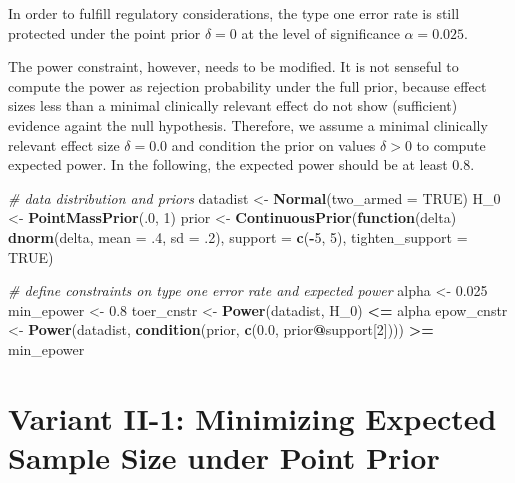 \documentclass[
]{book}
\newenvironment{Shaded}{\begin{snugshade}}{\end{snugshade}}
\newcommand{\CommentTok}[1]{\textcolor[rgb]{0.56,0.35,0.01}{\textit{#1}}}
\newcommand{\ControlFlowTok}[1]{\textcolor[rgb]{0.13,0.29,0.53}{\textbf{#1}}}
\newcommand{\DataTypeTok}[1]{\textcolor[rgb]{0.13,0.29,0.53}{#1}}
\newcommand{\DecValTok}[1]{\textcolor[rgb]{0.00,0.00,0.81}{#1}}
\newcommand{\FloatTok}[1]{\textcolor[rgb]{0.00,0.00,0.81}{#1}}
\newcommand{\KeywordTok}[1]{\textcolor[rgb]{0.13,0.29,0.53}{\textbf{#1}}}
\newcommand{\NormalTok}[1]{#1}
\newcommand{\OperatorTok}[1]{\textcolor[rgb]{0.81,0.36,0.00}{\textbf{#1}}}
\newcommand{\OtherTok}[1]{\textcolor[rgb]{0.56,0.35,0.01}{#1}}
\newcommand{\StringTok}[1]{\textcolor[rgb]{0.31,0.60,0.02}{#1}}
\begin{document}
In order to fulfill regulatory considerations, the type one error rate
is still protected under the point prior \(\delta = 0\) at the level
of significance \(\alpha = 0.025\).

The power constraint, however, needs to be modified.
It is not senseful to compute the power as rejection probability under
the full prior, because effect sizes less than a minimal clinically relevant
effect do not show (sufficient) evidence againt the null hypothesis.
Therefore, we assume a minimal clinically relevant effect size
\(\delta = 0.0\) and condition the prior on values \(\delta > 0\)
to compute expected power.
In the following, the expected power should be at least \(0.8\).

\begin{Shaded}
\begin{Highlighting}[]
\CommentTok{# data distribution and priors}
\NormalTok{datadist   <-}\StringTok{ }\KeywordTok{Normal}\NormalTok{(}\DataTypeTok{two_armed =} \OtherTok{TRUE}\NormalTok{)}
\NormalTok{H_}\DecValTok{0}\NormalTok{        <-}\StringTok{ }\KeywordTok{PointMassPrior}\NormalTok{(.}\DecValTok{0}\NormalTok{, }\DecValTok{1}\NormalTok{)}
\NormalTok{prior      <-}\StringTok{ }\KeywordTok{ContinuousPrior}\NormalTok{(}\ControlFlowTok{function}\NormalTok{(delta) }\KeywordTok{dnorm}\NormalTok{(delta, }\DataTypeTok{mean =} \FloatTok{.4}\NormalTok{, }\DataTypeTok{sd =} \FloatTok{.2}\NormalTok{),}
                              \DataTypeTok{support =} \KeywordTok{c}\NormalTok{(}\OperatorTok{-}\DecValTok{5}\NormalTok{, }\DecValTok{5}\NormalTok{),}
                              \DataTypeTok{tighten_support =} \OtherTok{TRUE}\NormalTok{)}

\CommentTok{# define constraints on type one error rate and expected power}
\NormalTok{alpha      <-}\StringTok{ }\FloatTok{0.025}
\NormalTok{min_epower <-}\StringTok{ }\FloatTok{0.8}
\NormalTok{toer_cnstr <-}\StringTok{ }\KeywordTok{Power}\NormalTok{(datadist, H_}\DecValTok{0}\NormalTok{) }\OperatorTok{<=}\StringTok{ }\NormalTok{alpha}
\NormalTok{epow_cnstr <-}\StringTok{ }\KeywordTok{Power}\NormalTok{(datadist, }\KeywordTok{condition}\NormalTok{(prior, }\KeywordTok{c}\NormalTok{(}\FloatTok{0.0}\NormalTok{, prior}\OperatorTok{@}\NormalTok{support[}\DecValTok{2}\NormalTok{]))) }\OperatorTok{>=}\StringTok{ }\NormalTok{min_epower}
\end{Highlighting}
\end{Shaded}

\hypertarget{variantII_1}{%
\section{Variant II-1: Minimizing Expected Sample Size under Point Prior}\label{variantII_1}}
\end{document}
